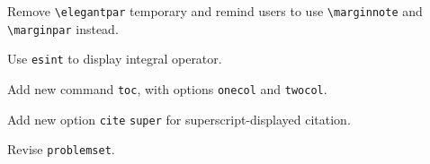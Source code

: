 
\begin{change}
  \item Remove \lstinline{\elegantpar} temporary and remind users to use \lstinline{\marginnote} and \lstinline{\marginpar} instead.
  \item Use \lstinline{esint} to display integral operator.
  \item Add new command \lstinline{toc}, with options  \lstinline{onecol} and \lstinline{twocol}.
  \item Add new option \lstinline{cite} \lstinline{super} for superscript-displayed citation.
  \item Revise \lstinline{problemset}.
\end{change}
